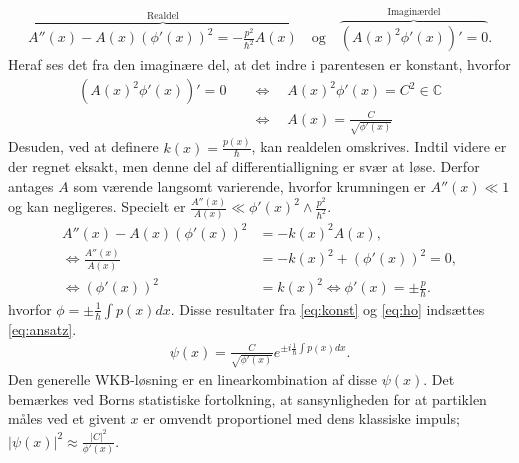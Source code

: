 \begin{align}
    \overbrace{A''(x) - A(x)\left( \phi'(x) \right)^{2} = - \frac{p^{2}}{\hbar^{2}}A(x)}^{\text{Realdel}} \quad \text{og} \quad%
    \overbrace{\left( A(x)^{2}\phi'(x) \right)' = 0}^{\text{Imaginærdel}}.
    \label{eq:realogimag}
\end{align}
Heraf ses det fra den imaginære del, at det indre i parentesen er konstant, hvorfor
\begin{align}
    \left( A(x)^{2}\phi'(x) \right)' = 0  \quad & \Leftrightarrow  \quad A(x)^{2}\phi'(x) = C^{2} \in \mathbb{C} \\
    & \Leftrightarrow  \quad A(x) = \frac{C}{\sqrt{\phi'(x)}}
    \label{eq:konst}
\end{align}
Desuden, ved at definere $k(x) = \frac{p(x)}{\hbar}$, kan realdelen omskrives. Indtil videre er der regnet eksakt, men denne del af differentialligning er svær at løse. Derfor antages $A$ som værende langsomt varierende, hvorfor krumningen er $A''(x)\ll 1$ og kan  negligeres. Specielt er $\frac{A''(x)}{A(x)} \ll \phi'(x)^{2}\wedge \frac{p^{2}}{\hbar^{2}}$.
\begin{align}
    A''(x) - A(x)(\phi'(x))^{2} & =  -k(x)^{2}A(x),\\
    \Leftrightarrow \frac{A''(x)}{A(x)} & = -k(x)^{2} + (\phi'(x))^{2} = 0, \\
    \Leftrightarrow \left(\phi'(x)\right)^{2} & = k(x)^{2} \Leftrightarrow  \phi'(x) = \pm \frac{p}{\hbar}.
    \label{eq:ho}
\end{align}
hvorfor $\phi = \pm \frac{1}{\hbar}\int p(x) dx$. Disse resultater fra \cref{eq:konst} og \cref{eq:ho} indsættes \cref{eq:ansatz}.
\begin{align}
    \psi(x) = \frac{C}{\sqrt{\phi'(x)}}e^{\pm i\frac{1}{\hbar}\int p(x) dx}.
    \label{eqpsi}
\end{align}
Den generelle WKB-løsning er en linearkombination af disse $\psi(x)$. Det bemærkes ved Borns statistiske fortolkning, at sansynligheden for at partiklen måles ved et givent $x$ er omvendt proportionel med dens klassiske impuls; $|\psi(x)|^2 \approx \frac{|C|^2}{\phi'(x)}$.
